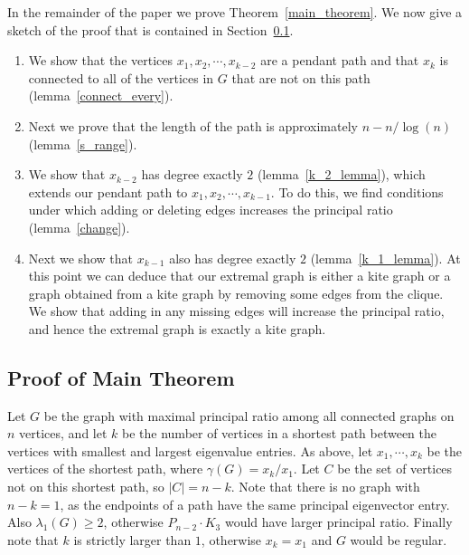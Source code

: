 In the remainder of the paper we prove Theorem~\ref{main_theorem}.
We now give a sketch of the proof that is contained in Section~\ref{sec_proof}.

\begin{enumerate}
 \item We show that the vertices $x_1, x_2, \cdots, x_{k-2}$ are
   a pendant path and that $x_k$ is connected to all of the vertices
   in $G$ that are not on this path (lemma~\ref{connect_every}).
 \item Next we prove that the length of the path is approximately
   $n - n/\log(n)$ (lemma~\ref{s_range}).
 \item We show that $x_{k-2}$ has degree exactly $2$ (lemma~\ref{k_2_lemma}), which
   extends our pendant path to $x_1, x_2, \cdots, x_{k-1}$.
   To do this, we find conditions under which adding or deleting
   edges increases the principal ratio (lemma~\ref{change}).
 \item Next we show that $x_{k-1}$ also has degree exactly $2$ (lemma~\ref{k_1_lemma}).
   At this point we can deduce that our extremal graph is either
   a kite graph or a graph obtained from a kite graph
   by removing some edges from the clique.  We show that
   adding in any missing edges will increase the principal ratio,
   and hence the extremal graph is exactly a kite graph.
   
\end{enumerate}

\subsection{Proof of Main Theorem}\label{sec_proof}



Let $G$ be the graph with maximal principal ratio among all connected
graphs on $n$ vertices, and let $k$ be the number of vertices in a
shortest path between the vertices with smallest and largest eigenvalue
entries. As above, let $x_1,\cdots, x_k$ be the vertices of the shortest path, where $\gamma(G) = x_k / x_1$.  Let $C$ be the set of vertices not on this shortest
path, so $|C| = n-k$.  Note that there is no graph with $n-k=1$, as the endpoints of a path have the same principal eigenvector entry.  Also
$\lambda_1(G) \geq 2$, otherwise $P_{n-2} \cdot K_3$ would have larger
principal ratio.  Finally note that $k$ is strictly larger than $1$,
otherwise $x_k = x_1$ and $G$ would be regular.


